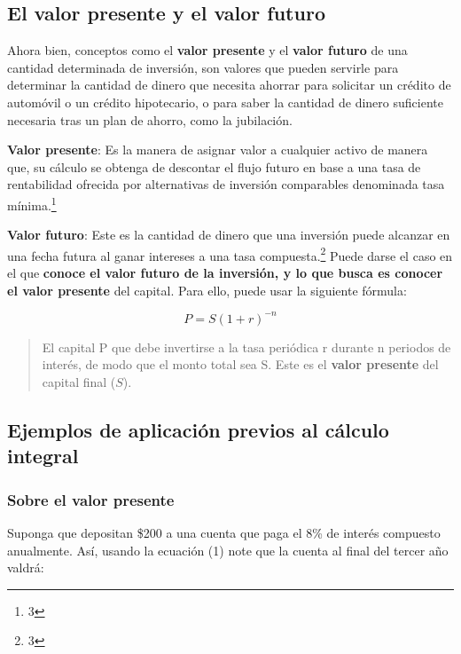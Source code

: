 \documentclass{article}
\begin{document}
        \subsection{El valor presente y el valor futuro}

            Ahora bien, conceptos como el \textbf{valor presente} y el \textbf{valor futuro} de una cantidad determinada de inversión, son valores que pueden servirle para determinar la cantidad de dinero que necesita ahorrar para solicitar un crédito de automóvil o un crédito hipotecario, o para saber la cantidad de dinero suficiente necesaria tras un plan de ahorro, como la jubilación.

            \textbf{Valor presente}: Es la manera de asignar valor a cualquier activo de manera que, su cálculo se obtenga de descontar el flujo futuro en base a una tasa de rentabilidad ofrecida por alternativas de inversión comparables denominada tasa mínima.\footnote[2]{3}

            \textbf{Valor futuro}: Este es la cantidad de dinero que una inversión puede alcanzar en una fecha futura al ganar intereses a una tasa compuesta.\footnote[3]{3} Puede darse el caso en el que \textbf{conoce el valor futuro de la inversión, y lo que busca es conocer el valor presente} del capital. Para ello, puede usar la siguiente fórmula:

            \begin{equation}
                P=S(1+r)^{-n}
            \end{equation}

            \begin{quote}
                El capital P que debe invertirse a la tasa periódica r durante n periodos de interés, de modo que el monto total sea S. Este es el \textbf{valor presente} del capital final ($S$).
            \end{quote}

        \subsection{Ejemplos de aplicación previos al cálculo integral}

            \subsubsection{Sobre el valor presente}

                Suponga que depositan \$200 a una cuenta que paga el 8\% de interés compuesto anualmente. Así, usando la ecuación (1) note que la cuenta al final del tercer año valdrá:
\end{document}
